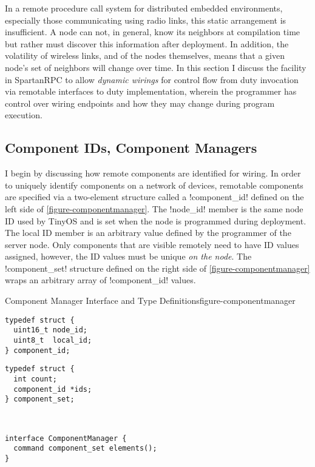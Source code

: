 In a remote procedure call system for distributed embedded environments, especially those
communicating using radio links, this static arrangement is insufficient. A node can not, in
general, know its neighbors at compilation time but rather must discover this information after
deployment. In addition, the volatility of wireless links, and of the nodes themselves, means
that a given node's set of neighbors will change over time. In this section I discuss the
facility in SpartanRPC to allow \emph{dynamic wirings} for control flow from duty invocation via
remotable interfaces to duty implementation, wherein the programmer has control over wiring
endpoints and how they may change during program execution.

\subsection{Component IDs, Component Managers}
\label{section-componentmanager}

I begin by discussing how remote components are identified for wiring. In order to uniquely
identify components on a network of devices, remotable components are specified via a
two-element structure called a !component_id! defined on the left side of
\autoref{figure-componentmanager}. The !node_id! member is the same node ID used by TinyOS and
is set when the node is programmed during deployment. The local ID member is an arbitrary value
defined by the programmer of the server node. Only components that are visible remotely need to
have ID values assigned, however, the ID values must be unique \emph{on the node}. The
!component_set! structure defined on the right side of \autoref{figure-componentmanager} wraps
an arbitrary array of !component_id! values.
 
\begin{fpfig}[t]{Component Manager Interface and Type Definitions}{figure-componentmanager}
{
\begin{minipage}[t]{2.5in}
\singlespace
\begin{lstlisting}
typedef struct {
  uint16_t node_id;
  uint8_t  local_id;
} component_id;
\end{lstlisting}
\primaryspacing
\end{minipage}
\hfill
\begin{minipage}[t]{2.5in}
\singlespace
\begin{lstlisting}
typedef struct {
  int count;
  component_id *ids;
} component_set;
\end{lstlisting}
\primaryspacing
\end{minipage}
\\
\centering
\begin{minipage}[t]{5in}
\vspace{1.5em}
\singlespace
\begin{lstlisting}
interface ComponentManager {
  command component_set elements();
}
\end{lstlisting}
\primaryspacing
\end{minipage}
}
\end{fpfig}


